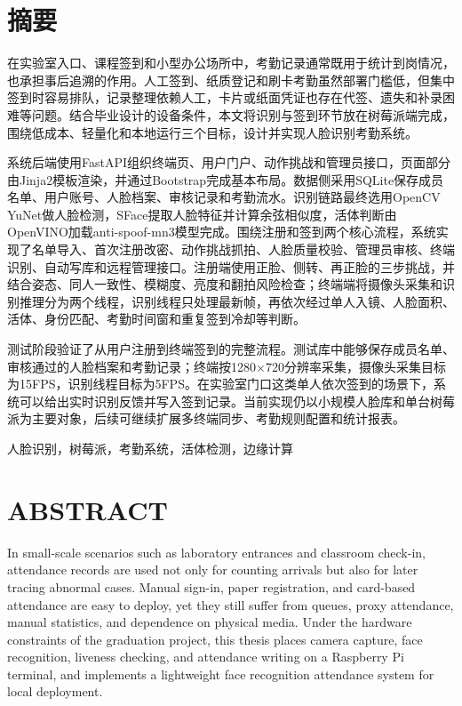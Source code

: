 \documentclass[UTF8]{heuthesis}
\begin{document}
\makeCover

\frontmatter
\chapter*{摘\quad 要}
在实验室入口、课程签到和小型办公场所中，考勤记录通常既用于统计到岗情况，也承担事后追溯的作用。人工签到、纸质登记和刷卡考勤虽然部署门槛低，但集中签到时容易排队，记录整理依赖人工，卡片或纸面凭证也存在代签、遗失和补录困难等问题。结合毕业设计的设备条件，本文将识别与签到环节放在树莓派端完成，围绕低成本、轻量化和本地运行三个目标，设计并实现人脸识别考勤系统。

系统后端使用FastAPI组织终端页、用户门户、动作挑战和管理员接口，页面部分由Jinja2模板渲染，并通过Bootstrap完成基本布局。数据侧采用SQLite保存成员名单、用户账号、人脸档案、审核记录和考勤流水。识别链路最终选用OpenCV YuNet做人脸检测，SFace提取人脸特征并计算余弦相似度，活体判断由OpenVINO加载anti-spoof-mn3模型完成。围绕注册和签到两个核心流程，系统实现了名单导入、首次注册改密、动作挑战抓拍、人脸质量校验、管理员审核、终端识别、自动写库和远程管理接口。注册端使用正脸、侧转、再正脸的三步挑战，并结合姿态、同人一致性、模糊度、亮度和翻拍风险检查；终端端将摄像头采集和识别推理分为两个线程，识别线程只处理最新帧，再依次经过单人入镜、人脸面积、活体、身份匹配、考勤时间窗和重复签到冷却等判断。

测试阶段验证了从用户注册到终端签到的完整流程。测试库中能够保存成员名单、审核通过的人脸档案和考勤记录；终端按1280×720分辨率采集，摄像头采集目标为15FPS，识别线程目标为5FPS。在实验室门口这类单人依次签到的场景下，系统可以给出实时识别反馈并写入签到记录。当前实现仍以小规模人脸库和单台树莓派为主要对象，后续可继续扩展多终端同步、考勤规则配置和统计报表。


\par{}人脸识别，树莓派，考勤系统，活体检测，边缘计算

\clearpage
\chapter*{ABSTRACT}
In small-scale scenarios such as laboratory entrances and classroom check-in, attendance records are used not only for counting arrivals but also for later tracing abnormal cases. Manual sign-in, paper registration, and card-based attendance are easy to deploy, yet they still suffer from queues, proxy attendance, manual statistics, and dependence on physical media. Under the hardware constraints of the graduation project, this thesis places camera capture, face recognition, liveness checking, and attendance writing on a Raspberry Pi terminal, and implements a lightweight face recognition attendance system for local deployment.
\end{document}
